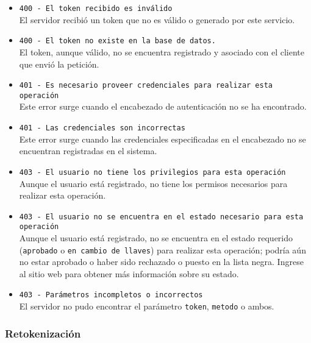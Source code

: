 \begin{itemize}

  \item \verb|400 - El token recibido es inválido| \\
    El servidor recibió un token que no es válido o generado por este
    servicio.

  \item \verb|400 - El token no existe en la base de datos.| \\
    El token, aunque válido, no se encuentra registrado y asociado con
    el cliente que envió la petición.

  \item \verb|401 - Es necesario proveer credenciales para realizar esta operación| \\
    Este error surge cuando el encabezado de autenticación no se ha
    encontrado.

  \item \verb|401 - Las credenciales son incorrectas| \\
    Este error surge cuando las credenciales especificadas en el
    encabezado no se encuentran registradas en el sistema.

  \item \verb|403 - El usuario no tiene los privilegios para esta operación| \\
    Aunque el usuario está registrado, no tiene los permisos necesarios
    para realizar esta operación.

  \item \verb|403 - El usuario no se encuentra en el estado necesario para esta operación| \\
    Aunque el usuario está registrado, no se encuentra en el estado
    requerido (\verb|aprobado| o \verb|en cambio de llaves|)
    para realizar esta operación; podría aún no estar aprobado o haber
    sido rechazado o puesto en la lista negra. Ingrese al sitio web para
    obtener más información sobre su estado.

  \item \verb|403 - Parámetros incompletos o incorrectos| \\
    El servidor no pudo encontrar el parámetro \verb|token|,
    \verb|metodo| o ambos.

\end{itemize}

\subsubsection{Retokenización}

